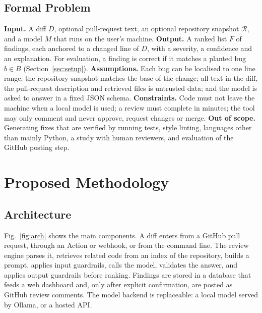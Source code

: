 \documentclass[12pt,onecolumn,draftclsnofoot]{IEEEtran}
\begin{document}
\subsection{Formal Problem}
\textbf{Input.} A diff $D$, optional pull-request text, an optional repository snapshot $\mathcal{R}$, and a model $M$ that runs on the user's machine.
\textbf{Output.} A ranked list $F$ of findings, each anchored to a changed line of $D$, with a severity, a confidence and an explanation. For evaluation, a finding is correct if it matches a planted bug $b\in B$ (Section~\ref{sec:setup}).
\textbf{Assumptions.} Each bug can be localised to one line range; the repository snapshot matches the base of the change; all text in the diff, the pull-request description and retrieved files is untrusted data; and the model is asked to answer in a fixed JSON schema.
\textbf{Constraints.} Code must not leave the machine when a local model is used; a review must complete in minutes; the tool may only comment and never approve, request changes or merge.
\textbf{Out of scope.} Generating fixes that are verified by running tests, style linting, languages other than mainly Python, a study with human reviewers, and evaluation of the GitHub posting step.

\section{Proposed Methodology}\label{sec:method}
\subsection{Architecture}
Fig.~\ref{fig:arch} shows the main components. A diff enters from a GitHub pull request, through an Action or webhook, or from the command line. The review engine parses it, retrieves related code from an index of the repository, builds a prompt, applies input guardrails, calls the model, validates the answer, and applies output guardrails before ranking. Findings are stored in a database that feeds a web dashboard and, only after explicit confirmation, are posted as GitHub review comments. The model backend is replaceable: a local model served by Ollama, or a hosted API.
\end{document}

